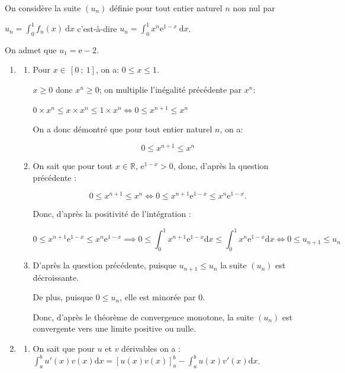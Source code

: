\documentclass[10pt]{article}
\providecommand{\R}{\mathbb{R}}
\providecommand{\e}{{\mathrm{e}}}
\renewcommand{\d}{{\mathrm{d}}}
\begin{document}
\smallskip

On considère la suite $(u_n)$ définie pour tout entier naturel $n$ non nul par 

\begin{center}$u_n = \displaystyle\int_0^1 f_n(x) \:\text{d}x$ \quad  c'est-à-dire \quad $u_n = \displaystyle\int_0^1 x^n \e^{1-x} \: \text{d}x$.\end{center}

On admet que $u_1 = \e - 2$.

\begin{enumerate}
	\item 
	
	\begin{enumerate}
	\item 	Pour $x \in \, [0~;~1]$, on a: $0\leqslant x \leqslant 1$.

$x\geqslant 0$ donc $x^n\geqslant 0$; on multiplie l'inégalité précédente par $x^n$:

$0\times x^n \leqslant x \times x^n  \leqslant 1 \times x^n 
\iff 0 \leqslant x^{n+1} \leqslant x^n$
	
On a donc démontré que pour tout entier naturel $n$, on a:

\[\boxed{0 \leqslant x^{n+1} \leqslant x^n}\]


		\item On sait que pour tout $x \in \R$, $\e^{1-x} > 0$, donc, d'après la question précédente :

\[0 \leqslant x^{n+1} \leqslant x^{n} \iff 0 \leqslant x^{n+1}\e^{1-x} \leqslant x^{n}\e^{1-x}.\]
		
		Donc, d'après la positivité de l'intégration :

\[0 \leqslant x^{n+1}\e^{1-x} \leqslant x^{n}\e^{1-x} \implies 0 \leqslant \int_{0}^{1}x^{n+1}\e^{1-x}\d x \leqslant \int_{0}^{1}x^{n}\e^{1-x}\d x \iff \boxed{0 \leqslant u_{n+1} \leqslant u_{n}}\]

		\item D'après la question précédente, puisque $u_{n+1} \leqslant u_{n}$ la suite $\left(u_{n}\right)$ est décroissante.
		
De plus, puisque $0 \leqslant u_{n}$, elle est minorée par $0$. 

Donc, d'après le théorème de convergence monotone, la suite $\left(u_{n}\right)$ est convergente vers une limite positive ou nulle.
	\end{enumerate}
	
	\item
	\begin{enumerate}
		\item On sait que pour $u$ et $v$ dérivables on a : $\displaystyle\int_{a}^{b}u'(x)v(x)\d x = \left[u(x)v(x)\right]_{a}^{b} - \displaystyle\int_{a}^{b}u(x)v'(x)\d x$.


\end{enumerate}
\end{enumerate}
\end{document}
